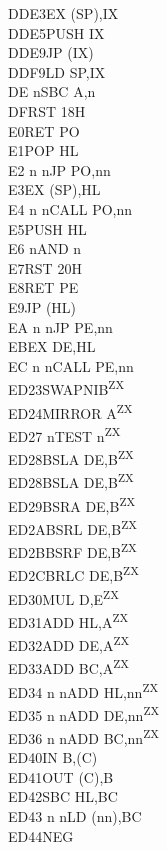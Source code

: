 \documentclass[twoside,openright,a4paper]{book}
\begin{document}
\begin{multicols}{3}
{\begin{tabbing}
	DDE3\>EX (SP),IX\\
	DDE5\>PUSH IX\\
	DDE9\>JP (IX)\\
	DDF9\>LD SP,IX\\
	DE n\>SBC A,n\\
	DF\>RST 18H\\
	E0\>RET PO\\
	E1\>POP HL\\
	E2 n n\>JP PO,nn\\
	E3\>EX (SP),HL\\
	E4 n n\>CALL PO,nn\\
	E5\>PUSH HL\\
	E6 n\>AND n\\
	E7\>RST 20H\\
	E8\>RET PE\\
	E9\>JP (HL)\\
	EA n n\>JP PE,nn\\
	EB\>EX DE,HL\\
	EC n n\>CALL PE,nn\\
	ED23\>SWAPNIB\textsuperscript{ZX}\\
	ED24\>MIRROR A\textsuperscript{ZX}\\
	ED27 n\>TEST n\textsuperscript{ZX}\\
	ED28\>BSLA DE,B\textsuperscript{ZX}\\
	ED28\>BSLA DE,B\textsuperscript{ZX}\\
	ED29\>BSRA DE,B\textsuperscript{ZX}\\
	ED2A\>BSRL DE,B\textsuperscript{ZX}\\
	ED2B\>BSRF DE,B\textsuperscript{ZX}\\
	ED2C\>BRLC DE,B\textsuperscript{ZX}\\
	ED30\>MUL D,E\textsuperscript{ZX}\\
	ED31\>ADD HL,A\textsuperscript{ZX}\\
	ED32\>ADD DE,A\textsuperscript{ZX}\\
	ED33\>ADD BC,A\textsuperscript{ZX}\\
	ED34 n n\>ADD HL,nn\textsuperscript{ZX}\\
	ED35 n n\>ADD DE,nn\textsuperscript{ZX}\\
	ED36 n n\>ADD BC,nn\textsuperscript{ZX}\\
	ED40\>IN B,(C)\\
	ED41\>OUT (C),B\\
	ED42\>SBC HL,BC\\
	ED43 n n\>LD (nn),BC\\
	ED44\>NEG\\

\end{tabbing}}
\end{multicols}
\end{document}
